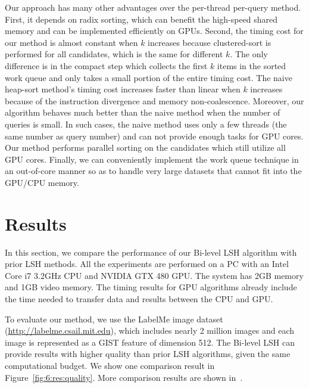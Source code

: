 Our approach has many other advantages over the per-thread per-query method. First, it depends on radix sorting, which can benefit the high-speed shared memory and can be implemented efficiently on GPUs.
Second, the timing cost for our method is almost constant when $k$ increases because clustered-sort is performed for all candidates, which is the same for different $k$. The only difference is in the compact step which collects the first $k$ items in the sorted work queue and only takes a small portion of the entire timing cost. The naive heap-sort method's timing cost increases faster than linear when $k$ increases because of the instruction divergence and memory non-coalescence. Moreover, our algorithm behaves much better than the naive method when the number of queries is small. In such cases, the naive method uses only a few threads (the same number as query number) and can not provide enough tasks for GPU cores. Our method performs parallel sorting on the candidates which still utilize all GPU cores. Finally, we can conveniently implement the work queue technique in an out-of-core manner so as to handle very large datasets that cannot fit into the GPU/CPU memory.


\section{Results}
\label{sec:6:res}
In this section, we compare the performance of our Bi-level LSH algorithm with prior LSH methods. All the experiments are performed on a PC with an Intel Core i7 3.2GHz CPU and NVIDIA GTX 480 GPU. The system has 2GB memory and 1GB video memory. The timing results for GPU algorithms already include the time needed to transfer data and results between the CPU and GPU.

To evaluate our method, we use the LabelMe image dataset (\url{http://labelme.csail.mit.edu}), which includes nearly 2 million images and each image is represented as a GIST feature of dimension 512. The Bi-level LSH can provide results with higher quality than prior LSH algorithms, given the same computational budget. We show one comparison result in Figure~\ref{fig:6:res:quality}. More comparison results are shown in~\cite{BilevelLSH2011}.

